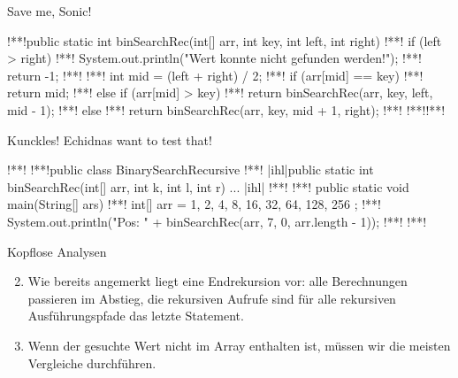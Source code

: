 {\begin{frame}[fragile,c]{Save me, Sonic!}
\begin{plainjava}
!**!public static int binSearchRec(int[] arr, int key, int left, int right) {
!**!    if (left > right) {
!**!        System.out.println("Wert konnte nicht gefunden werden!");
!**!        return -1;
!**!    }
!**!    int mid = (left + right) / 2;
!**!    if (arr[mid] == key) {
!**!        return mid;
!**!    } else if (arr[mid] > key) {
!**!        return binSearchRec(arr, key, left, mid - 1);
!**!    } else {
!**!        return binSearchRec(arr, key, mid + 1, right);
!**!    }
!**!}!**!
\end{plainjava}
\end{frame}
\begin{frame}[fragile,c]{Kunckles! Echidnas want to test that!}
\SetupLstHl
\begin{plainjava}
!**!
!**!public class BinarySearchRecursive {
!**!   |ihl|public static int binSearchRec(int[] arr, int k, int l, int r) { ... } |ihl|
!**!
!**!   public static void main(String[] ars) {
!**!      int[] arr = { 1, 2, 4, 8, 16, 32, 64, 128, 256 };
!**!      System.out.println("Pos: " + binSearchRec(arr, 7, 0, arr.length - 1));
!**!   }
!**!}
\end{plainjava}
\end{frame}

\begin{frame}[c]{Kopflose Analysen}
\begin{enumerate}[<+(1)->]
    \setcounter{enumi}{1}
    \itemsep12pt
    \item {}\pause
    Wie bereits angemerkt liegt eine Endrekursion vor: \pause alle Berechnungen passieren im Abstieg, die rekursiven Aufrufe sind für alle rekursiven Ausführungspfade das letzte Statement.
    \item {}\pause
    Wenn der gesuchte Wert nicht im Array enthalten ist, müssen wir die meisten Vergleiche durchführen.\pause {}
\end{enumerate}
\end{frame}

}
